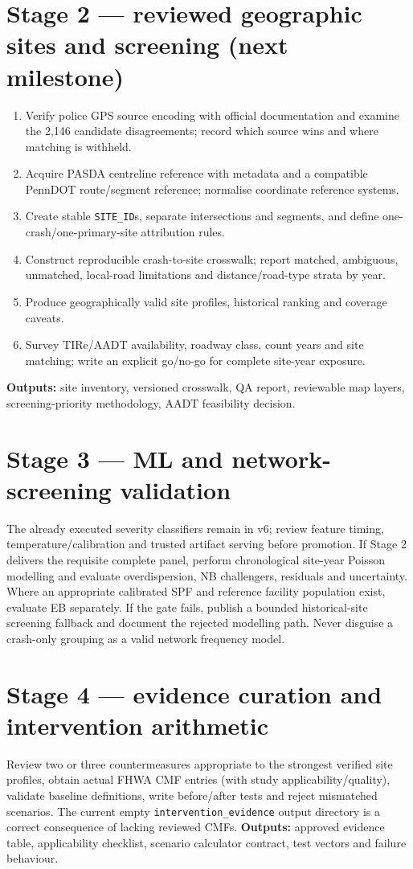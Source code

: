 \documentclass[11pt,a4paper,openany]{report}
\newcommand{\pathcode}[1]{\nolinkurl{#1}}
\begin{document}
\section{Stage 2 --- reviewed geographic sites and screening (next milestone)}
\begin{enumerate}
\item Verify police GPS source encoding with official documentation and examine the 2,146 candidate disagreements; record which source wins and where matching is withheld.
\item Acquire PASDA centreline reference with metadata and a compatible PennDOT route/segment reference; normalise coordinate reference systems.
\item Create stable \pathcode{SITE_ID}s, separate intersections and segments, and define one-crash/one-primary-site attribution rules.
\item Construct reproducible crash-to-site crosswalk; report matched, ambiguous, unmatched, local-road limitations and distance/road-type strata by year.
\item Produce geographically valid site profiles, historical ranking and coverage caveats.
\item Survey TIRe/AADT availability, roadway class, count years and site matching; write an explicit go/no-go for complete site-year exposure.
\end{enumerate}
\textbf{Outputs:} site inventory, versioned crosswalk, QA report, reviewable map layers, screening-priority methodology, AADT feasibility decision.

\section{Stage 3 --- ML and network-screening validation}
The already executed severity classifiers remain in v6; review feature timing, temperature/calibration and trusted artifact serving before promotion. If Stage 2 delivers the requisite complete panel, perform chronological site-year Poisson modelling and evaluate overdispersion, NB challengers, residuals and uncertainty. Where an appropriate calibrated SPF and reference facility population exist, evaluate EB separately. If the gate fails, publish a bounded historical-site screening fallback and document the rejected modelling path. Never disguise a crash-only grouping as a valid network frequency model.

\section{Stage 4 --- evidence curation and intervention arithmetic}
Review two or three countermeasures appropriate to the strongest verified site profiles, obtain actual FHWA CMF entries (with study applicability/quality), validate baseline definitions, write before/after tests and reject mismatched scenarios. The current empty \pathcode{intervention_evidence} output directory is a correct consequence of lacking reviewed CMFs. \textbf{Outputs:} approved evidence table, applicability checklist, scenario calculator contract, test vectors and failure behaviour.
\end{document}
